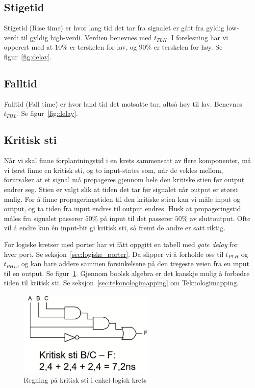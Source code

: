 \documentclass[12pt,a4paper,norsk]{article}
\begin{document}
\subsection{Stigetid}
Stigetid (Rise time) er hvor lang tid det tar fra signalet
er gått fra gyldig low-verdi til gyldig high-verdi. Verdien benevnes med
$t_{TLH}$. I forelesning har vi opperert med at $10\%$ er terskelen for lav, og
$90\%$ er terskelen for høy. Se figur~\ref{fig:delay}.

\subsection{Falltid}
Falltid (Fall time) er hvor land tid det motsatte tar, altså høy til lav.
Benevnes $t_{THL}$. Se figur~\ref{fig:delay}.

\subsection{Kritisk sti}\label{sec:kritisk_sti}
Når vi skal finne forplantningstid i en krets sammensatt av flere komponenter,
må vi først finne en kritisk sti, og to input-states som, når de vekles mellom,
forursaker at et signal må propageres gjennom hele den kritiske stien før output
endrer seg. Stien er valgt slik at tiden det tar før signalet når output er størst
mulig. For å finne propageringstiden til den kritiske stien kan vi måle input og
output, og ta tiden fra input endres til output endres. Husk at
propageringstid måles fra signalet passerer $50\%$ på input til det passerer
$50\%$ av sluttoutput. Ofte vil å endre kun én input-bit gi kritisk sti, så
fremt de andre er satt riktig.

For logiske kretser med porter har vi fått oppgitt en tabell med \textit{gate
  delay} for hver port. Se seksjon~\ref{sec:logiske_porter}. Da slipper vi å
forholde oss til $t_{PLH}$ og $t_{PHL}$, og kan bare addere sammen
forsinkelsene på den tregeste veien fra en input til en output. Se
figur~\ref{fig:kritisk_sti}. Gjennom boolsk algebra er det kanskje
mulig å forbedre tiden til kritisk sti. Se seksjon~\ref{sec:tekonologimapping}
om Teknologimapping.

\begin{figure}[hbt!]
  \centering
  \includegraphics[width=0.6\textwidth,height=\textheight,keepaspectratio]{Krets_DuringTeknomap}
  \caption{Regning på kritisk sti i enkel logisk krets\label{fig:kritisk_sti}}
\end{figure}
\end{document}
